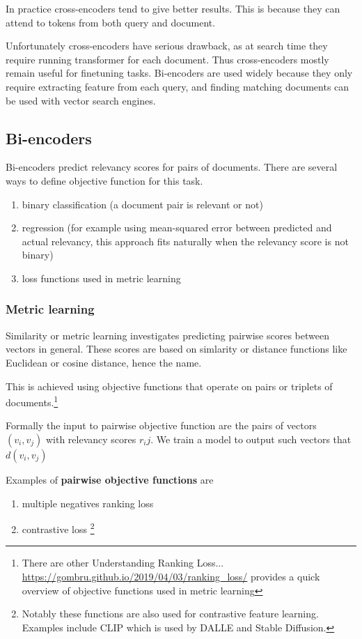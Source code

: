 \documentclass[longabstract,mgr,english]{iithesis}
\begin{document}
In practice cross-encoders tend to give better results. This is because they can attend to tokens from both query and document. 

Unfortunately cross-encoders have serious drawback, as at search time they require running transformer for each document. Thus cross-encoders mostly remain useful for finetuning tasks. Bi-encoders are used widely because they only require extracting feature from each query, and finding matching documents can be used with vector search engines.

\subsection{Bi-encoders}

Bi-encoders predict relevancy scores for pairs of documents. There are several ways to define objective function for this task.

\begin{enumerate}
    \item binary classification (a document pair is relevant or not)
    \item regression (for example using mean-squared error between predicted and actual relevancy, this approach fits naturally when the relevancy score is not binary)
    \item loss functions used in metric learning
\end{enumerate}

\subsubsection{Metric learning}

Similarity or metric learning\cite{metric-learning-reality} investigates predicting pairwise scores between vectors in general. These scores are based on simlarity or distance functions like Euclidean or cosine distance, hence the name.

This is achieved using objective functions that operate on pairs or triplets of documents.\footnote[1]{There are other  Understanding Ranking Loss... \url{https://gombru.github.io/2019/04/03/ranking_loss/} provides a quick overview of objective functions  used in metric learning}

Formally the input to pairwise objective function are the pairs of vectors $(v_i, v_j)$ with relevancy scores $r_ij$. We train a model to output such vectors that $d(v_i, v_j)$

Examples of \textbf{pairwise objective functions} are
\begin{enumerate}
    \item multiple negatives ranking loss\cite{mnrl}\label{mnrl}
    \item contrastive loss \footnote{Notably these functions are also used for contrastive feature learning. Examples include CLIP which is used by DALLE and Stable Diffusion.}
\end{enumerate}
\end{document}
